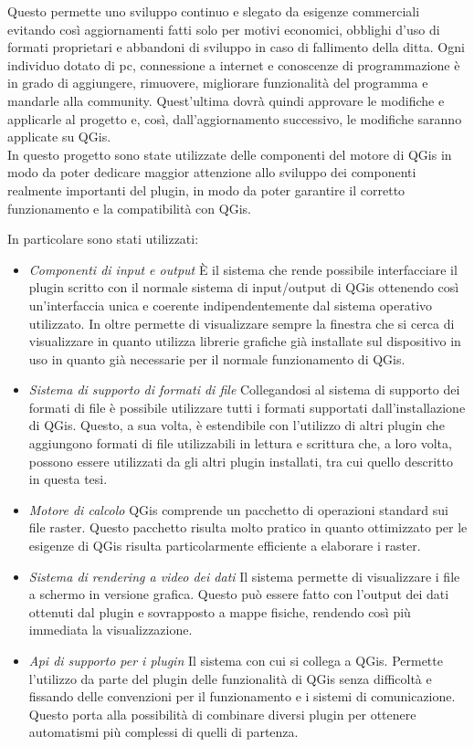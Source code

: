 Questo permette uno sviluppo continuo e slegato da esigenze commerciali evitando così aggiornamenti fatti solo per motivi economici, obblighi d'uso di formati proprietari e abbandoni di sviluppo in caso di fallimento della ditta. Ogni individuo dotato di pc, connessione a internet e conoscenze di programmazione è in grado di aggiungere, rimuovere, migliorare funzionalità del programma e mandarle alla community. Quest'ultima dovrà quindi approvare le modifiche e applicarle al progetto e, così, dall'aggiornamento successivo, le modifiche saranno applicate su QGis.\\


In questo progetto sono state utilizzate delle componenti del motore di QGis in modo da poter dedicare maggior attenzione allo sviluppo dei componenti realmente importanti del plugin, in modo da poter garantire il corretto funzionamento e la compatibilità con QGis.

In particolare sono stati utilizzati:
\begin{itemize}
	\item \textit{Componenti di input e output} È il sistema che rende possibile interfacciare il plugin scritto con il normale sistema di input/output di QGis ottenendo così un'interfaccia unica e coerente indipendentemente dal sistema operativo utilizzato. In oltre permette di visualizzare sempre la finestra che si cerca di visualizzare in quanto utilizza librerie grafiche già installate sul dispositivo in uso in quanto già necessarie per il normale funzionamento di QGis.
	\item \textit{Sistema di supporto di formati di file} Collegandosi al sistema di supporto dei formati di file è possibile utilizzare tutti i formati supportati dall'installazione di QGis. Questo, a sua volta, è estendibile con l'utilizzo di altri plugin che aggiungono formati di file utilizzabili in lettura e scrittura che, a loro volta, possono essere utilizzati da gli altri plugin installati, tra cui quello descritto in questa tesi.
	\item \textit{Motore di calcolo} QGis comprende un pacchetto di operazioni standard sui file raster. Questo pacchetto risulta molto pratico in quanto ottimizzato per le esigenze di QGis risulta particolarmente efficiente a elaborare i raster.
	\item \textit{Sistema di rendering a video dei dati} Il sistema permette di visualizzare i file a schermo in versione grafica. Questo può essere fatto con l'output dei dati ottenuti dal plugin e sovrapposto a mappe fisiche, rendendo così più immediata la visualizzazione.
	\item \textit{Api di supporto per i plugin} Il sistema con cui si collega a QGis. Permette l'utilizzo da parte del plugin delle funzionalità di QGis senza difficoltà e fissando delle convenzioni per il funzionamento e i sistemi di comunicazione. Questo porta alla possibilità di combinare diversi plugin per ottenere automatismi più complessi di quelli di partenza.
\end{itemize}


